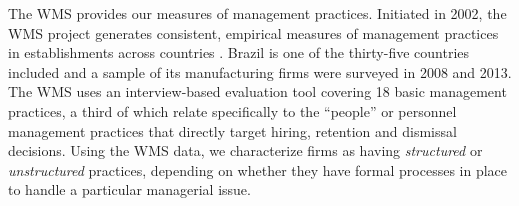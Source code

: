 The WMS provides our measures of management practices.  Initiated in 2002, the WMS project generates consistent, empirical measures of management practices in establishments across countries \citep{bloom_qje2007}.  Brazil is one of the thirty-five countries included and a sample of its manufacturing firms were surveyed in 2008 and 2013. The WMS uses an interview-based evaluation tool covering 18 basic management practices, a third of which relate specifically to the ``people'' or personnel management practices that directly target hiring, retention and dismissal decisions.  Using the WMS data, we characterize firms as having \emph{structured} or \emph{unstructured} practices, depending on whether they have formal processes in place to handle a particular managerial issue.  






